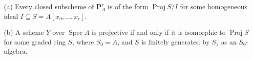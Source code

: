 (a) Every closed subscheme of $\mathbf{P}_A^r$ is of the form $\operatorname{Proj} S/I$ for some homogeneous ideal $I \subseteq S = A[x_0, \ldots, x_r]$.

(b) A scheme $Y$ over $\operatorname{Spec} A$ is projective if and only if it is isomorphic to $\operatorname{Proj} S$ for some graded ring $S$, where $S_0 = A$, and $S$ is finitely generated by $S_1$ as an $S_0$-algebra.
